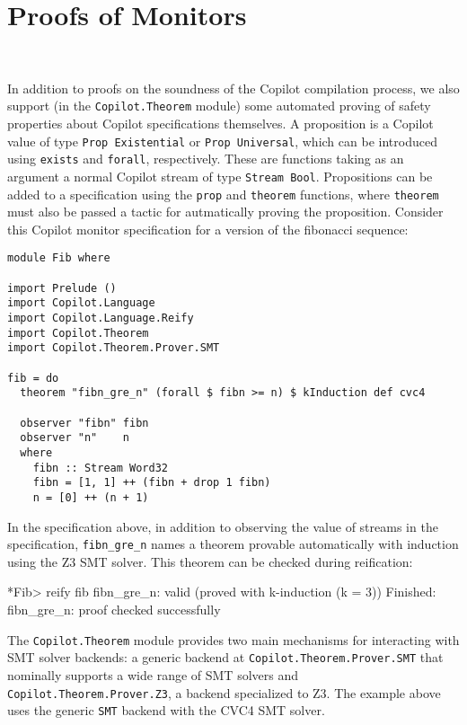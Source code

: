 \section{Proofs of Monitors}~\label{sec:proof}

In addition to proofs on the soundness of the Copilot compilation process, we
also support (in the {\tt Copilot.Theorem} module) some automated proving of
safety properties about Copilot specifications themselves. A proposition is a
Copilot value of type \lstinline{Prop Existential} or \lstinline{Prop Universal},
 which can be introduced using \lstinline{exists} and
\lstinline{forall}, respectively. These are functions taking as an argument a
normal Copilot stream of type \lstinline{Stream Bool}. Propositions can be added
to a specification using the \lstinline{prop} and \lstinline{theorem} functions,
where \lstinline{theorem} must also be passed a tactic for autmatically proving
the proposition. Consider this Copilot monitor specification for a version of
the fibonacci sequence:

\begin{lstlisting}[language = Copilot]
module Fib where

import Prelude ()
import Copilot.Language
import Copilot.Language.Reify
import Copilot.Theorem
import Copilot.Theorem.Prover.SMT

fib = do
  theorem "fibn_gre_n" (forall $ fibn >= n) $ kInduction def cvc4

  observer "fibn" fibn
  observer "n"    n
  where
    fibn :: Stream Word32
    fibn = [1, 1] ++ (fibn + drop 1 fibn)
    n = [0] ++ (n + 1)
\end{lstlisting}

In the specification above, in addition to observing the value of streams in
the specification, \lstinline{fibn_gre_n} names a theorem provable
automatically with induction using the Z3 SMT solver. This theorem can be
checked during reification:

\begin{code}
*Fib> reify fib
fibn_gre_n: valid (proved with k-induction (k = 3))
Finished: fibn_gre_n: proof checked successfully
\end{code}

The {\tt Copilot.Theorem} module provides two main mechanisms for interacting
with SMT solver backends: a generic backend at {\tt Copilot.Theorem.Prover.SMT}
that nominally supports a wide range of SMT solvers and {\tt
Copilot.Theorem.Prover.Z3}, a backend specialized to Z3. The example above uses
the generic {\tt SMT} backend with the CVC4 SMT solver.


